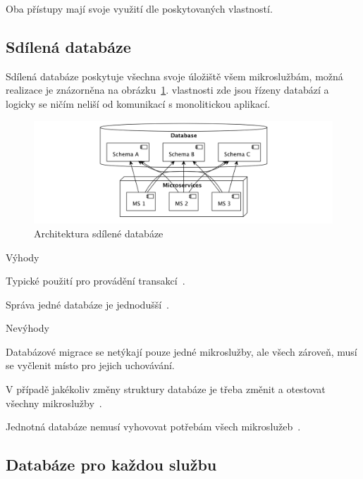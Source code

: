 Oba přístupy mají svoje využití dle poskytovaných vlastností.



\subsection{Sdílená databáze}\label{subsec:shared-db}

Sdílená databáze poskytuje všechna svoje úložiště všem mikroslužbám, možná realizace je znázorněna na obrázku~\ref{fig:db-shared}.  vlastnosti zde jsou řízeny databází a logicky se ničím neliší od komunikací s monolitickou aplikací.

\begin{figure}[htbp]
   \centering
   \includegraphics[max width=\textwidth]{assets/db-shared}
   \caption{Architektura sdílené databáze}\label{fig:db-shared}
\end{figure}

Výhody
\begin{ul}
   \item Typické použití  pro provádění transakcí~\cite{shareddb}.
   \item Správa jedné databáze je jednodušší~\cite{shareddb}.
\end{ul}

Nevýhody
\begin{ul}
   \item Databázové migrace se netýkají pouze jedné mikroslužby, ale všech zároveň, musí se vyčlenit místo pro jejich uchovávání.
   \item V případě jakékoliv změny struktury databáze je třeba změnit a otestovat všechny mikroslužby~\cite{shareddb}.
   \item Jednotná databáze nemusí vyhovovat potřebám všech mikroslužeb~\cite{shareddb}.
\end{ul}



\subsection{Databáze pro každou službu}\label{subsec:msa-db-per-service}

